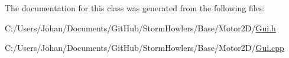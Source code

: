 The documentation for this class was generated from the following files\+:\begin{DoxyCompactItemize}
\item 
C\+:/\+Users/\+Johan/\+Documents/\+Git\+Hub/\+Storm\+Howlers/\+Base/\+Motor2\+D/\mbox{\hyperlink{_gui_8h}{Gui.\+h}}\item 
C\+:/\+Users/\+Johan/\+Documents/\+Git\+Hub/\+Storm\+Howlers/\+Base/\+Motor2\+D/\mbox{\hyperlink{_gui_8cpp}{Gui.\+cpp}}\end{DoxyCompactItemize}
